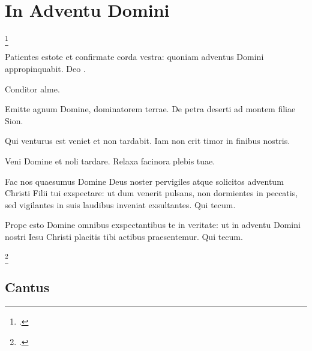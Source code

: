 \chapter{In Adventu Domini}

\footcite[83r]{bp1502}
\vspace{3mm}


Patientes estote et confirmate corda vestra:
quoniam adventus Domini appropinquabit.
Deo .

Conditor alme.

Emitte agnum Domine, dominatorem terrae.
De petra deserti ad montem filiae Sion.

Qui venturus est veniet et non tardabit. Iam non erit timor in finibus nostris.

Veni Domine et noli tardare. Relaxa facinora plebis tuae.

Fac nos quaesumus Domine Deus noster pervigiles atque solicitos adventum
Christi Filii tui exspectare: ut dum venerit pulsans,
non dormientes in peccatis, sed vigilantes in suis laudibus inveniat
exsultantes. Qui tecum.

Prope esto Domine omnibus exspectantibus te in veritate:
ut in adventu Domini nostri Iesu Christi placitis tibi actibus praesentemur.
Qui tecum.

\footcite[83r-83v]{bp1502}

\section*{Cantus}

